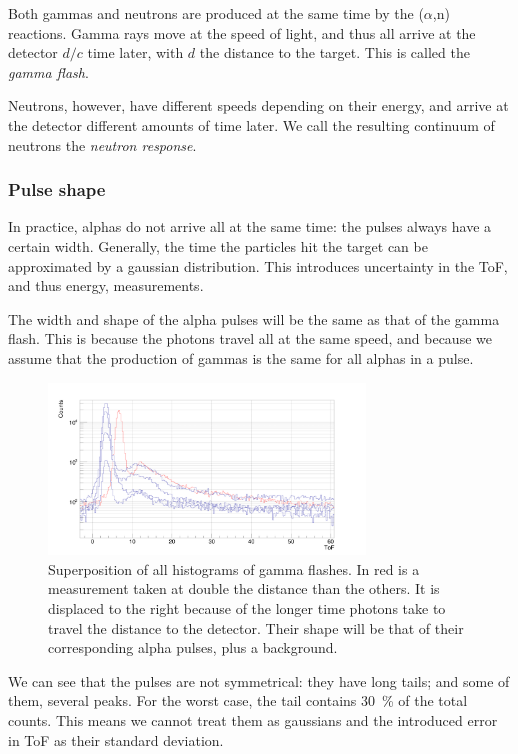 \documentclass[a4paper,12pt]{report}
\newcommand{\an}{($\alpha$,n) }
\begin{document}
Both gammas and neutrons are produced at the same time by the \an reactions.	%
Gamma rays move at the speed of light, and thus all arrive at the detector $d/c$ time later, with $d$ the distance to the target.
This is called the \textit{gamma flash}.

Neutrons, however, have different speeds depending on their energy, and arrive at the detector different amounts of time later.
We call the resulting continuum of neutrons the \textit{neutron response}.
\\

\subsubsection{Pulse shape}
In practice, alphas do not arrive all at the same time: the pulses always have a certain width.
Generally, the time the particles hit the target can be approximated by a gaussian distribution.
This introduces uncertainty in the ToF, and thus energy, measurements.

The width and shape of the alpha pulses will be the same as that of the gamma flash.
This is because the photons travel all at the same speed, and because we assume that the production of gammas is the same for all alphas in a pulse.
\\

\begin{figure}[H]
	\centering
	\includegraphics[width=0.75\textwidth]{uneven_gflash.png}
	\caption{Superposition of all histograms of gamma flashes.
	In red is a measurement taken at double the distance than the others.
	It is displaced to the right because of the longer time photons take to travel the distance to the detector.
	Their shape will be that of their corresponding alpha pulses, plus a background.}
	\label{uneven_gflash}
\end{figure}

We can see that the pulses are not symmetrical: they have long tails; and some of them, several peaks.
For the worst case, the tail contains \qty{30}{\percent} of the total counts.
This means we cannot treat them as gaussians and the introduced error in ToF as their standard deviation.
\end{document}
